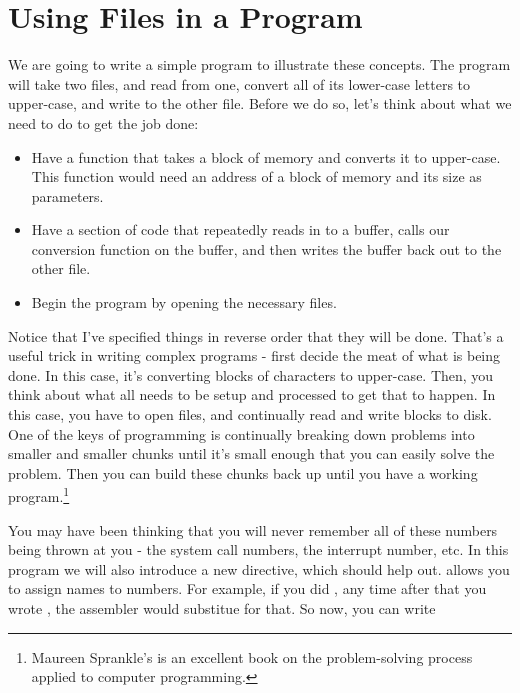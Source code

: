\section{Using Files in a Program}

We are going to write a simple program to illustrate these concepts.  The 
program will take two files, and read from one, convert all of its 
lower-case letters to upper-case, and write to the other file.  Before we
do so, let's think about what we need to do to get the job done:

\begin{itemize}\item Have a function that takes a block of memory and converts it to upper-case.
This function would need an address of a block of memory and its size as
parameters. 
\item Have a section of code that repeatedly reads in to a buffer, calls our
conversion function on the buffer, and then writes the buffer back out
to the other file. 
\item Begin the program by opening the necessary files. 
\end{itemize}

Notice that I've specified things in reverse order that they will be done.  
That's a useful trick in writing complex programs - first decide the meat
of what is being done.  In this case, it's converting blocks of characters
to upper-case.  Then, you think about what all needs to be setup and processed to 
get that to happen.  In this case, you have to open files, 
and continually read and write
blocks to disk.  One of the keys of programming is continually breaking
down problems into smaller and smaller chunks until it's small enough that
you can easily solve the problem.  Then you can build these chunks back
up until you have a working program.\footnote{Maureen Sprankle's
 is an 
excellent book on the problem-solving process applied to computer programming.
}

You may have been thinking that you will never remember all of these numbers
being thrown at you - the system call numbers, the interrupt number, etc.
In this program we will also introduce a new directive, 
which should help out.   allows you to assign names
to numbers.  For example, if you did 
, any time after that you wrote
, the assembler would substitue 
 for that.  So now, you can write 

